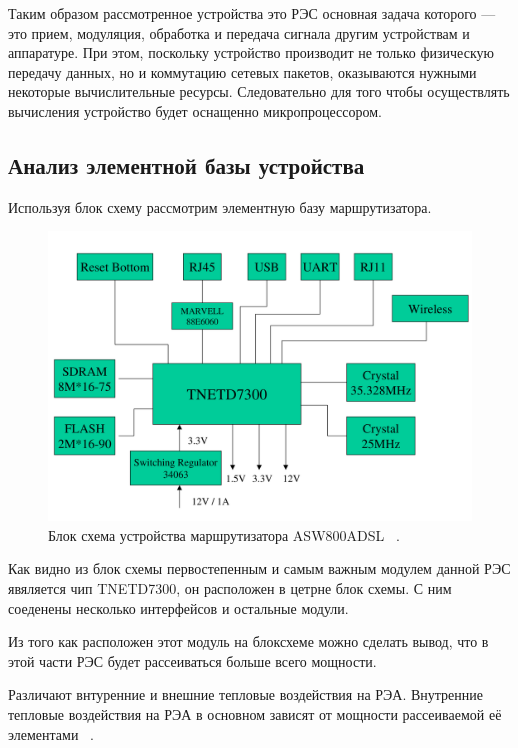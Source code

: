 Таким образом рассмотренное устройства это РЭС основная задача
которого — это прием, модуляция, обработка и передача сигнала другим
устройствам и аппаратуре. При этом, поскольку устройство производит не
только физическую передачу данных, но и коммутацию сетевых пакетов,
оказываются нужными некоторые вычислительные ресурсы.
Следовательно для того чтобы осуществлять вычисления устройство будет
оснащенно микропроцессором.

\subsection{Анализ элементной базы устройства}

Используя блок схему рассмотрим элементную базу
маршрутизатора.


\begin{figure}[h] %
  \centering
\includegraphics[scale = 0.7]{images/block_diagram-0.png}
\caption{Блок схема устройства маршрутизатора ASW800ADSL ~\cite{BLOCK-DIAGRAM}.}
\end{figure}
 
Как видно из блок схемы первостепенным и самым важным модулем данной
РЭС явяляется чип TNETD7300, он расположен в цетрне блок схемы. С ним
соеденены несколько интерфейсов и остальные модули.

Из того как расположен этот модуль на блоксхеме можно сделать вывод,
что в этой части РЭС будет рассеиваться больше всего мощности.

Различают внтуренние и внешние тепловые воздействия на РЭА.
Внутренние тепловые воздействия на РЭА в основном зависят от мощности
рассеиваемой её элементами ~\cite{Rotkop1976}.

